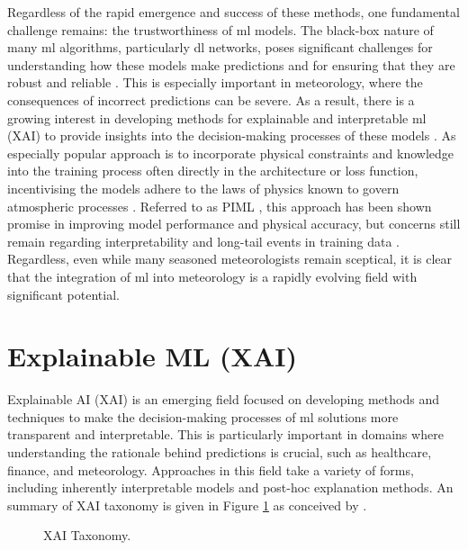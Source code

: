 Regardless of the rapid emergence and success of these methods, one fundamental challenge remains: the trustworthiness of \acrshort{ml} models. The black-box nature of many \acrshort{ml} algorithms, particularly \acrshort{dl} networks, poses significant challenges for understanding how these models make predictions and for ensuring that they are robust and reliable . This is especially important in meteorology, where the consequences of incorrect predictions can be severe. As a result, there is a growing interest in developing methods for explainable and interpretable \acrshort{ml} (XAI)  to provide insights into the decision-making processes of these models . As especially popular approach is to incorporate physical constraints and knowledge into the training process often directly in the architecture or loss function, incentivising the models adhere to the laws of physics known to govern atmospheric processes . Referred to as PIML , this approach has been shown promise in improving model performance and physical accuracy, but concerns still remain regarding interpretability and long-tail events in training data . Regardless, even while many seasoned meteorologists remain sceptical, it is clear that the integration of \acrshort{ml} into meteorology is a rapidly evolving field with significant potential.

\section{Explainable ML (XAI)}

Explainable AI (XAI)  is an emerging field focused on developing methods and techniques to make the decision-making processes of \acrshort{ml} solutions more transparent and interpretable. This is particularly important in domains where understanding the rationale behind predictions is crucial, such as healthcare, finance, and meteorology. Approaches in this field take a variety of forms, including inherently interpretable models and post-hoc explanation methods. An summary of XAI taxonomy is given in Figure \ref{fig:xai-taxonomy} as conceived by .

\begin{figure}[h]
    \centering
    \caption{XAI Taxonomy.}
    \label{fig:xai-taxonomy}
\end{figure}

